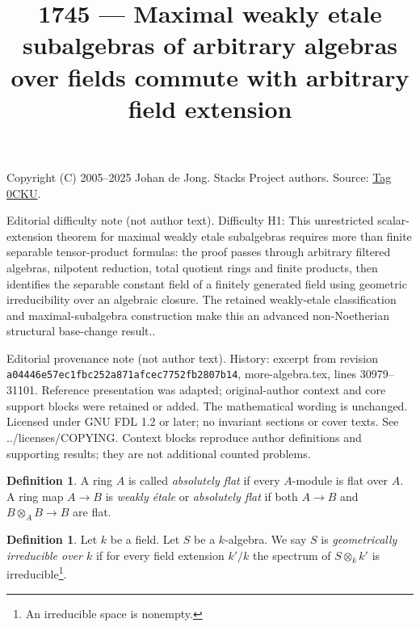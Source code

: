 \documentclass{amsart}
\theoremstyle{plain}
\theoremstyle{definition}
\newtheorem{definition}[subsection]{Definition}
\theoremstyle{remark}
\numberwithin{equation}{subsection}
\begin{document}
\title[Stacks Project, Tag 0CKU]{1745 --- Maximal weakly etale subalgebras of arbitrary algebras over fields commute with arbitrary field extension}
\maketitle
\noindent Copyright (C) 2005--2025 Johan de Jong. Stacks Project authors. Source: \href{https://stacks.math.columbia.edu/tag/0CKU}{Tag 0CKU}.

\noindent Editorial difficulty note (not author text). Difficulty H1: This unrestricted scalar-extension theorem for maximal weakly etale subalgebras requires more than finite separable tensor-product formulas: the proof passes through arbitrary filtered algebras, nilpotent reduction, total quotient rings and finite products, then identifies the separable constant field of a finitely generated field using geometric irreducibility over an algebraic closure. The retained weakly-etale classification and maximal-subalgebra construction make this an advanced non-Noetherian structural base-change result..

\noindent Editorial provenance note (not author text). History: excerpt from revision \texttt{a0444\allowbreak 6e57e\allowbreak c1fbc\allowbreak 252a8\allowbreak 71afc\allowbreak ec775\allowbreak 2fb28\allowbreak 07b14}, more-algebra.tex, lines 30979--31101. Reference presentation was adapted; original-author context and core support blocks were retained or added. The mathematical wording is unchanged. Licensed under GNU FDL 1.2 or later; no invariant sections or cover texts. See ../licenses/COPYING. Context blocks reproduce author definitions and supporting results; they are not additional counted problems.

\begin{definition}
\label{definition-weakly-etale}
A ring $A$ is called {\it absolutely flat} if every $A$-module is flat over
$A$. A ring map $A \to B$ is {\it weakly \'etale} or {\it absolutely flat}
if both $A \to B$ and $B \otimes_A B \to B$ are flat.
\end{definition}

\begin{definition}
\label{algebra-definition-geometrically-irreducible}
Let $k$ be a field.
Let $S$ be a $k$-algebra.
We say $S$ is {\it geometrically irreducible over $k$}
if for every field extension $k'/k$ the spectrum of
$S \otimes_k k'$ is irreducible\footnote{An irreducible space is nonempty.}.
\end{definition}
\end{document}

